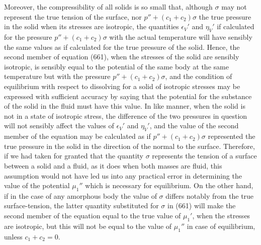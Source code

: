 \documentclass[12pt]{memoir}
\begin{document}
Moreover, the compressibility of all solids is so small that, although $\sigma$ may not represent the true tension of the surface, nor $p'' + (c_1 + c_2)\sigma$ the true pressure in the solid when its stresses are isotropic, the quantities $\epsilon_V'$ and $\eta_V'$ if calculated for the pressure $p'' + (c_1 + c_2)\sigma$ with the actual temperature will have sensibly the same values as if calculated for the true pressure of the solid. Hence, the second member of equation (661), when the stresses of the solid are sensibly isotropic, is sensibly equal to the potential of the same body at the same temperature but with the pressure $p'' + (c_1 + c_2)\sigma$, and the condition of equilibrium with respect to dissolving for a solid of isotropic stresses may be expressed with sufficient accuracy by saying that the potential for the substance of the solid in the fluid must have this value. In like manner, when the solid is not in a state of isotropic stress, the difference of the two pressures in question will not sensibly affect the values of $\epsilon_V'$ and $\eta_V'$, and the value of the second member of the equation may be calculated as if $p'' + (c_1 + c_2)\sigma$ represented the true pressure in the solid in the direction of the normal to the surface. Therefore, if we had taken for granted that the quantity $\sigma$ represents the tension of a surface between a solid and a fluid, as it does when both masses are fluid, this assumption would not have led us into any practical error in determining the value of the potential $\mu_1''$ which is necessary for equilibrium. On the other hand, if in the case of any amorphous body the value of $\sigma$ differs notably from the true surface-tension, the latter quantity substituted for $\sigma$ in (661) will make the second member of the equation equal to the true value of $\mu_1'$, when the stresses are isotropic, but this will not be equal to the value of $\mu_1''$ in case of equilibrium, unless $c_1 + c_2 =0$.
\end{document}

